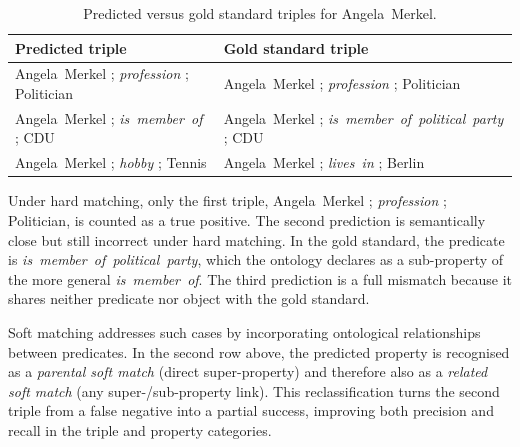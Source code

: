 \documentclass[a4paper,oneside,bibliography=totoc]{scrbook}
\begin{document}
\begin{table}[ht]
  \centering
  \label{tab:merkel_triples}
  \begin{tabular}{p{}p{}}
    \toprule
    \textbf{Predicted triple} & \textbf{Gold standard triple}                               \\ \midrule
    Angela~Merkel ; \textit{profession} ; Politician
                              & Angela~Merkel ; \textit{profession} ; Politician            \\[0.2em]
    Angela~Merkel ; \textit{is~member~of} ; CDU
                              & Angela~Merkel ; \textit{is~member~of~political~party} ; CDU \\[0.2em]
    Angela~Merkel ; \textit{hobby} ; Tennis
                              & Angela~Merkel ; \textit{lives~in} ; Berlin                  \\
    \bottomrule
  \end{tabular}
  \caption{Predicted versus gold standard triples for Angela~Merkel.}
\end{table}

Under hard matching, only the first triple, Angela~Merkel ; \textit{profession} ; Politician, is counted as a true positive. The second prediction is semantically close but still incorrect under hard matching. In the gold standard, the predicate is \textit{is~member~of~political~party}, which the ontology declares as a sub-property of the more general \textit{is~member~of}. The third prediction is a full mismatch because it shares neither predicate nor object with the gold standard.

Soft matching addresses such cases by incorporating ontological relationships between predicates. In the second row above, the predicted property is recognised as a \emph{parental soft match} (direct super-property) and therefore also as a \emph{related soft match} (any super-/sub-property link). This reclassification turns the second triple from a false negative into a partial success, improving both precision and recall in the triple and property categories.
\end{document}
